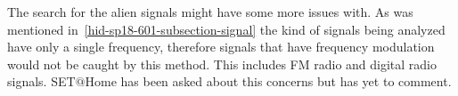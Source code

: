 The search for the alien signals might have some more issues with. As was 
mentioned in~\ref{hid-sp18-601-subsection-signal} the kind of signals being 
analyzed have only a single frequency, therefore signals that have frequency 
modulation would not be caught by this method. This includes FM radio and 
digital radio signals. SET$@$Home has been asked about this concerns but has 
yet to comment.


\begin{acks}

\end{acks}


 

